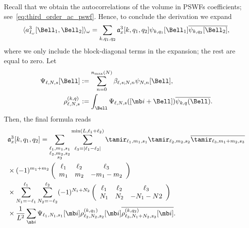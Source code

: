 \documentclass[9pt,twocolumn,twoside,lineno]{pnas-new}
\begin{document}
Recall that we obtain the autocorrelations of the volume in PSWFs coefficients; see~\eqref{eq:third_order_ac_pswf}. Hence, to conclude the derivation we expand
\[ \langle a^3_{I_{\omega}}[\Bell_1, \Bell_2]\rangle_{\omega}= \sum_{k,q_1,q_2}\mathfrak{a}_x^3[k,q_1,q_2]\psi_{k,q_1}[\Bell_1]\overline{\psi_{k,q_2}[\Bell_2]},\]
where we only include the block-diagonal terms in the expansion; the rest are equal to zero. Let
\begin{align*}
\Psi_{\ell,N,s}[\Bell] &:= \sum_{n=0}^{n_{\text{max}}(N)}\beta_{\ell,s;N,n}\psi_{N,n}[\Bell],\\ 
\rho_{\ell,N,s}^{(k,q)}&:=\int_{\Bell}\Psi_{\ell,N,s}([\mb i+\Bell])\overline{\psi_{k,q}(\Bell)}.
\end{align*}
Then, 
the final formula reads
\begin{align} \label{eq:ac_3_prolates}
 &\mathfrak{a}_x^3[k,q_1,q_2] = \sum_{\substack{\ell_1,m_1,s_1\nonumber \\ \ell_2,m_2,s_2\\s_3}}\sum_{\ell_3=|\ell_1-\ell_2|}^{\min(L,\ell_1+\ell_2)}\tamir_{\ell_1,m_1,s_1}\tamir_{\ell_2,m_2,s_2}\overline{\tamir_{\ell_3,m_1+m_2,s_3}}\\
&\times (-1)^{m_1+m_2}\left(\begin{array}{ccc}\ell_1 & \ell_2  & \ell_3\\ m_1 & m_2 & -m_1-m_2\end{array}\right)\\
&\times \sum_{N_1=-\ell_1}^{\ell_1}\sum_{N_2=-\ell_2}^{\ell_2}(-1)^{N_1+N_2}\left(\begin{array}{ccc}\ell_1 & \ell_2  & \ell_3\nonumber\\ N_1 & N_2 & -N_1-N2\end{array}\right)\nonumber\\&\times\frac{1}{L^2}\sum_{\mb i}\Psi_{\ell_1,N_1,s_1}[\mb i]\rho_{\ell_2,N_2,s_2}^{(k,q_1)}[\mb i]\overline{\rho_{\ell_3,N_1+N_2,s_3}^{(k,q_2)}[\mb i]}. \nonumber
\end{align}
%
\end{document}

